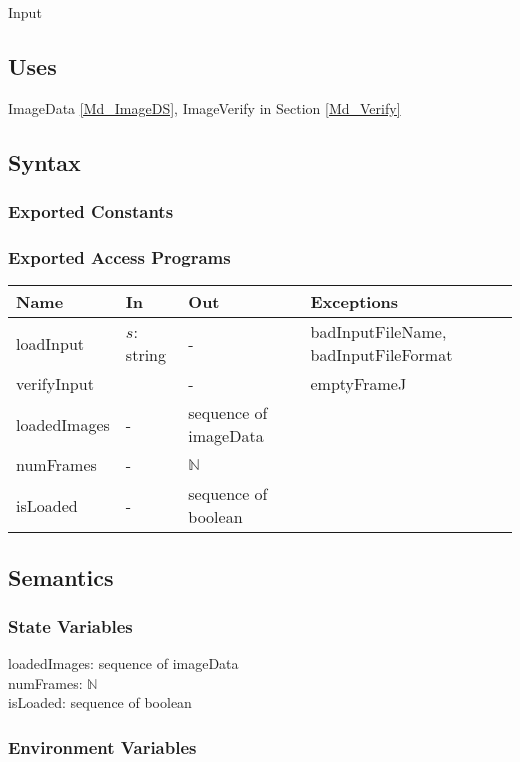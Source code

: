 \documentclass[12pt, titlepage]{article}
\begin{document}
Input

\subsection{Uses}

ImageData \ref{Md_ImageDS}, ImageVerify in Section \ref{Md_Verify}

\subsection{Syntax}

\subsubsection{Exported Constants}

\subsubsection{Exported Access Programs}

\begin{center}
\begin{tabular}{p{3cm} p{2cm} p{5cm} p{3cm}}
\hline
\textbf{Name} & \textbf{In} & \textbf{Out} & \textbf{Exceptions} \\
\hline
loadInput & $s$: string & - & badInputFileName, badInputFileFormat\\
verifyInput & & - & emptyFrameJ \\
loadedImages & - & sequence of imageData\\
numFrames & - & $\mathbb{N}$ & \\
isLoaded & - & sequence of boolean\\
\hline
\end{tabular}
\end{center}

\subsection{Semantics}

\subsubsection{State Variables}

loadedImages: sequence of imageData\\
numFrames: $\mathbb{N}$\\
isLoaded: sequence of boolean

\subsubsection{Environment Variables}
\end{document}

